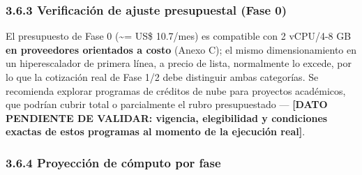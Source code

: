 \documentclass[11pt,a4paper]{article}
\begin{document}
\subsubsection{3.6.3 Verificación de ajuste presupuestal (Fase 0)}\label{verificaciuxf3n-de-ajuste-presupuestal-fase-0}

El presupuesto de Fase 0 (\textasciitilde= US\$ 10.7/mes) es compatible con 2 vCPU/4-8 GB \textbf{en proveedores orientados a costo} (Anexo C); el mismo dimensionamiento en un hiperescalador de primera línea, a precio de lista, normalmente lo excede, por lo que la cotización real de Fase 1/2 debe distinguir ambas categorías. Se recomienda explorar programas de créditos de nube para proyectos académicos, que podrían cubrir total o parcialmente el rubro presupuestado --- \textbf{{[}DATO PENDIENTE DE VALIDAR: vigencia, elegibilidad y condiciones exactas de estos programas al momento de la ejecución real{]}}.

\subsubsection{3.6.4 Proyección de cómputo por fase}\label{proyecciuxf3n-de-cuxf3mputo-por-fase}
\end{document}
